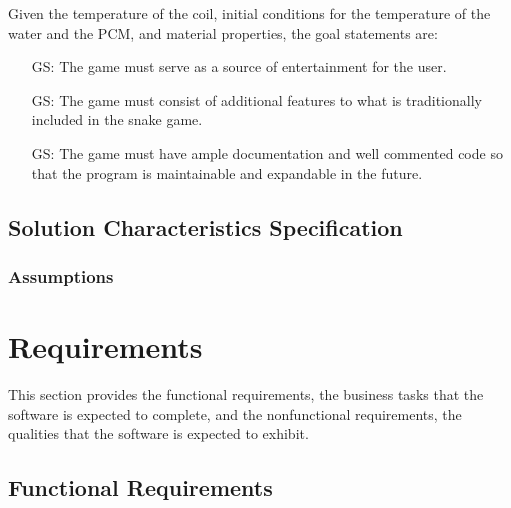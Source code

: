 \documentclass[12pt]{article}
\newcounter{goalnum} %
\begin{document}
\noindent Given the temperature of the coil, initial conditions for the temperature of 
the water and the PCM, and material properties, the goal statements are:

\begin{itemize}

\item[GS\refstepcounter{goalnum}\thegoalnum:] The game must serve as a source of entertainment for the user.

\item[GS\refstepcounter{goalnum}\thegoalnum:] The game must consist of additional features to what is traditionally included in the snake game.
	
\item[GS\refstepcounter{goalnum}\thegoalnum:] The game must have ample documentation and well commented code so that the program is maintainable and expandable in the future.

\end{itemize}

\subsection{Solution Characteristics Specification}


\subsubsection{Assumptions}


\section{Requirements}

This section provides the functional requirements, the business tasks that the
software is expected to complete, and the nonfunctional requirements, the
qualities that the software is expected to exhibit.

\subsection{Functional Requirements}
\end{document}
